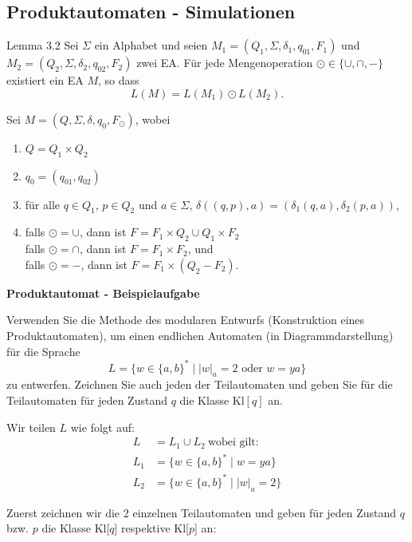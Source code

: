 \documentclass[a4paper, 11pt]{article}
\newcommand\myTitle[1]{{\large \textbf {#1}}}
\begin{document}
    \subsection{Produktautomaten - Simulationen}
    \begin{mainbox}{Lemma 3.2}
        Sei $\Sigma$ ein Alphabet und seien $M_1 = (Q_1, \Sigma, \delta_1, q_{01}, F_1)$ und $M_2 = (Q_2, \Sigma, \delta_2, q_{02}, F_2)$ zwei EA. Für jede Mengenoperation $\odot \in \{\cup, \cap, -\}$ existiert ein EA $M$, so dass
        $$L(M) = L(M_1) \odot L(M_2).$$
    \end{mainbox}
    Sei $M = (Q, \Sigma, \delta, q_0, F_{\odot})$, wobei
    \begin{enumerate}[label=(\roman*)]
        \item $Q = Q_1 \times Q_2$
        \item $q_0 = (q_{01}, q_{02})$
        \item für alle $q \in Q_1$, $p \in Q_2$ und $a \in \Sigma$, $\delta((q,p), a) = (\delta_1(q,a), \delta_2(p, a))$,
        \item falls $\odot = \cup$, dann ist $F = F_1 \times Q_2 \cup Q_1 \times F_2$\\
        falls $\odot = \cap$, dann ist $F = F_1 \times F_2$, und\\
        falls $\odot = -$, dann ist $F = F_1 \times (Q_2 - F_2)$.
    \end{enumerate}



    \myTitle{Produktautomat - Beispielaufgabe}

    Verwenden Sie die Methode des modularen Entwurfs (Konstruktion eines Produktautomaten), um einen endlichen Automaten (in Diagrammdarstellung) für die Sprache 
    $$L = \{w \in \{a, b\}^* \mid |w|_a = 2 \text{ oder } w = ya\}$$
    zu entwerfen. Zeichnen Sie auch jeden der Teilautomaten und geben Sie für die Teilautomaten für jeden Zustand $q$ die Klasse Kl$[q]$ an.

    Wir teilen $L$ wie folgt auf:
    \begin{align*}
        L &= L_1 \cup L_2 \ \text{wobei gilt:} \\
        L_1 &= \{w \in \{a,b\}^* \mid w = ya\} \\
        L_2 &= \{w \in \{a,b\}^* \mid |w|_a = 2\}
    \end{align*}
    
    Zuerst zeichnen wir die 2 einzelnen Teilautomaten und geben für jeden Zustand $q$ bzw. $p$ die Klasse Kl[$q$] respektive Kl[$p$] an:
\end{document}
